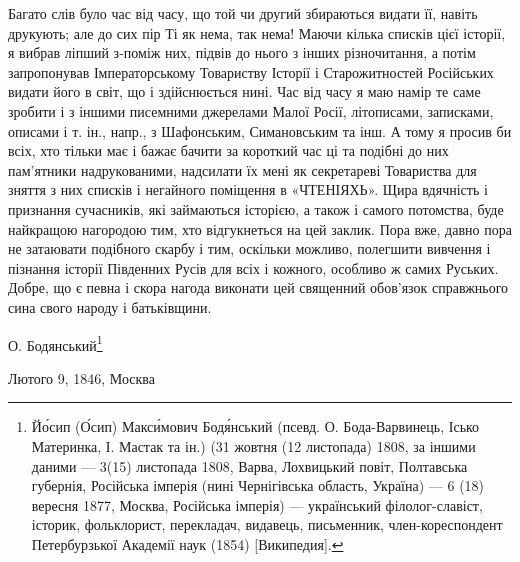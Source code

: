 \begin{zznagolos}
\begin{multicols}{2}
Багато слів було час від часу, що той чи другий збираються видати її, навіть
друкують; але до сих пір Ті як нема, так нема! Маючи кілька списків цієї
історії, я вибрав ліпший з-поміж них, підвів до нього з інших різночитання, а
потім запропонував Імператорському Товариству Історії і Старожитностей
Російських видати його в світ, що і здійснюється нині. Час від часу я маю намір
те саме зробити і з іншими писемними джерелами Малої Росії, літописами,
записками, описами і т. ін., напр., з Шафонським, Симановським та інш.  А тому
я просив би всіх, хто тільки має і бажає бачити за короткий час ці та подібні
до них пам'ятники надрукованими, надсилати їх мені як секретареві Товариства
для зняття з них списків і негайного поміщення в «ЧТЕНІЯХЬ». Щира вдячність і
признання сучасників, які займаються історією, а також і самого потомства, буде
найкращою нагородою тим, хто відгукнеться на цей заклик. Пора вже, давно пора
не затаювати подібного скарбу і тим, оскільки можливо, полегшити вивчення і
пізнання історії Південних Русів для всіх і кожного, особливо ж самих Руських.
Добре, що є певна і скора нагода виконати цей священний обов'язок справжнього
сина свого народу і батьківщини.

О. Бодянський\footnote{%
Йо́сип (О́сип) Макси́мович Бодя́нський (псевд. О. Бода-Варвинець, Ісько
Материнка, І. Мастак та ін.) (31 жовтня (12 листопада) 1808, за іншими
даними — 3(15) листопада 1808, Варва, Лохвицький повіт, Полтавська
губернія, Російська імперія (нині Чернігівська область, Україна) — 6
(18) вересня 1877, Москва, Російська імперія) — український
філолог-славіст, історик, фольклорист, перекладач, видавець, письменник,
член-кореспондент Петербурзької Академії наук (1854) [Википедия].
}

Лютого 9, 1846, Москва

\end{multicols} %
\end{zznagolos}

